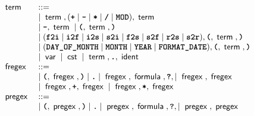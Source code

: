 \begin{figure}
\[\begin{array}{ll}
			\;\mathsf{term}\;           & ::=                                                                                                                                                                           \\
			                       & \mid \;\mathsf{term}\;, (\texttt{\textbf{+}} \mid \texttt{\textbf{-}} \mid \texttt{\textbf{*}} \mid  \texttt{\textbf{/}} \mid \texttt{\textbf{MOD}}), \;\mathsf{term}\;                                                                   \\
			                       & \mid \texttt{\textbf{-}}, \;\mathsf{term}\; \mid \texttt{\textbf{(}}, \;\mathsf{term}\;, \texttt{\textbf{)}}                                                                                                          \\
			                       & \mid (\texttt{\textbf{f2i}} \mid \texttt{\textbf{i2f}} \mid \texttt{\textbf{i2s}} \mid \texttt{\textbf{s2i}} \mid \texttt{\textbf{f2s}} \mid \texttt{\textbf{s2f}} \mid \texttt{\textbf{r2s}} \mid \texttt{\textbf{s2r}}), \texttt{\textbf{(}}, \;\mathsf{term}\;, \texttt{\textbf{)}} \\
			                       & \mid (\texttt{\textbf{DAY\_OF\_MONTH}} \mid \texttt{\textbf{MONTH}} \mid \texttt{\textbf{YEAR}} \mid \texttt{\textbf{FORMAT\_DATE}}), \texttt{\textbf{(}}, \;\mathsf{term}\;, \texttt{\textbf{)}}                                              \\
			                       & \mid \;\mathsf{var}\; \mid \;\mathsf{cst}\; \mid \;\mathsf{term}\;, \texttt{\textbf{.}}, \;\mathsf{ident}\;                                                                                                 \\
			\;\mathsf{fregex}\;         & ::=                                                                                                                                                                           \\ & \mid \texttt{\textbf{(}}, \;\mathsf{fregex}\;, \texttt{\textbf{)}} \mid \texttt{\textbf{.}} \mid \;\mathsf{fregex}\;, \;\mathsf{formula}\;, \texttt{\textbf{?}}, \mid \;\mathsf{fregex}\;, \;\mathsf{fregex}\;                \\
			                       & \mid \;\mathsf{fregex}\;, \texttt{\textbf{+}}, \;\mathsf{fregex}\; \mid \;\mathsf{fregex}\;, \texttt{\textbf{*}}, \;\mathsf{fregex}\;                                                                                 \\
			\;\mathsf{pregex}\;         & ::=                                                                                                                                                                           \\ & \mid \texttt{\textbf{(}}, \;\mathsf{pregex}\;, \texttt{\textbf{)}} \mid \texttt{\textbf{.}} \mid \;\mathsf{pregex}\;, \;\mathsf{formula}\;, \texttt{\textbf{?}}, \mid \;\mathsf{pregex}\;, \;\mathsf{pregex}\;                \\

\end{array}\]
\end{figure}
